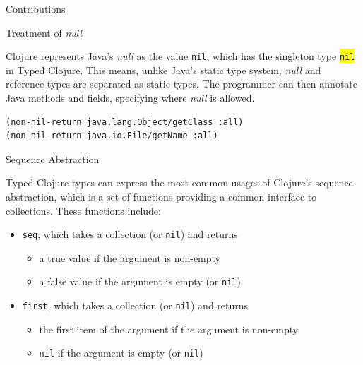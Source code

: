 \documentclass[landscape,final,a0paper,fontscale=0.277]{baposter}
\begin{document}
\begin{poster}
\begin{posterbox}[name=contribution,column=0,below=problem]{Contributions}
\begin{itemize}
\end{itemize}

\end{posterbox}

\begin{posterbox}[name=nulltreatment,column=0,above=bottom]{Treatment of \emph{null}}

Clojure represents Java's \emph{null} as the value \colorbox{codebg}{\lstinline{nil}},
which has the singleton type \colorbox{yellow}{\lstinline|nil|} in Typed Clojure.
This means, unlike Java's static type system, \emph{null} and reference types are separated as static types.
The programmer can then annotate Java methods and fields, specifying where \emph{null} is allowed.

\begin{lstlisting}[caption={Annotating Java methods that never return \emph{null}}]
(non-nil-return java.lang.Object/getClass :all)
(non-nil-return java.io.File/getName :all)
\end{lstlisting}
\end{posterbox}

\begin{posterbox}[name=sequenceabs,column=1]{Sequence Abstraction}

Typed Clojure types can express the most common usages of Clojure's sequence abstraction, 
which is a set of functions providing a common interface to collections.
These functions include:

\begin{itemize}
\item \colorbox{codebg}{\lstinline|seq|}, which takes a collection (or \colorbox{codebg}{\lstinline|nil|}) and returns
   \begin{itemize}
      \item a true value if the argument is non-empty
      \item a false value if the argument is empty (or \colorbox{codebg}{\lstinline|nil|})
   \end{itemize}
\item \colorbox{codebg}{\lstinline|first|}, which takes a collection (or \colorbox{codebg}{\lstinline|nil|}) and returns
   \begin{itemize}
      \item the first item of the argument if the argument is non-empty
      \item \colorbox{codebg}{\lstinline|nil|} if the argument is empty (or \colorbox{codebg}{\lstinline|nil|})
    \end{itemize}
\end{itemize}


\end{posterbox}
\end{poster}
\end{document}
